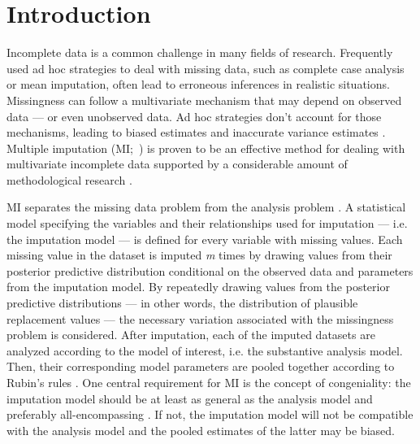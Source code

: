 \documentclass[3p,12pt,a4paper]{elsarticle}
\begin{document}
\newpage
\tableofcontents
\newpage
\section{Introduction}
Incomplete data is a common challenge in many fields of research. Frequently used ad hoc strategies to deal with missing data, such as complete case analysis or mean imputation, often lead to erroneous inferences in realistic situations. Missingness can follow a multivariate mechanism that may depend on observed data --- or even unobserved data. Ad hoc strategies don't account for those mechanisms, leading to biased estimates and inaccurate variance estimates \citep{buurenFlexibleImputationMissing2018, kang2013, enders2017, austin2021, little2002}. Multiple imputation (MI;~) is proven to be an effective method for dealing with multivariate incomplete data supported by a considerable amount of methodological research \citep{mistlerComparisonJointModel2017, buurenFlexibleImputationMissing2018, enders2017, burgette2010, austin2021, audigier2018, vanbuuren2007, grund2021, hughes2014, little2002}.

MI separates the missing data problem from the analysis problem \citep{mistlerComparisonJointModel2017, buurenFlexibleImputationMissing2018, enders2017, burgette2010, austin2021, audigier2018, vanbuuren2007, grund2021, hughes2014, little2002, carpenter2013, bartlett2015}. A statistical model specifying the variables and their relationships used for imputation --- i.e. the imputation model --- is defined for every variable with missing values. Each missing value in the dataset is imputed \textit{m} times by drawing values from their posterior predictive distribution conditional on the observed data and parameters from the imputation model. By repeatedly drawing values from the posterior predictive distributions --- in other words, the distribution of plausible replacement values --- the necessary variation associated with the missingness problem is considered. After imputation, each of the imputed datasets are analyzed according to the model of interest, i.e. the substantive analysis model. Then, their corresponding model parameters are pooled together according to Rubin's rules \citep{rubin1987}. 
One central requirement for MI is the concept of congeniality: the imputation model should be at least as general as the analysis model and preferably all-encompassing \citep{grund2018, enders2018, meng1994multiple, bartlett2015, grund2016, little2002}. If not, the imputation model will not be compatible with the analysis model and the pooled estimates of the latter may be biased. 
\end{document}
